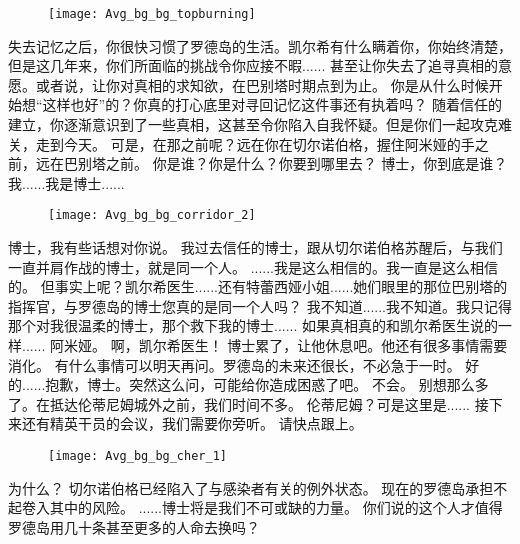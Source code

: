 \documentclass[openany]{book}
\begin{document}
\begin{figure}[h]
    \centering
    \texttt{[image: Avg\_bg\_bg\_topburning]}
\end{figure}
\begin{dialogue}
     失去记忆之后，你很快习惯了罗德岛的生活。凯尔希有什么瞒着你，你始终清楚，但是这几年来，你们所面临的挑战令你应接不暇......
     甚至让你失去了追寻真相的意愿。或者说，让你对真相的求知欲，在巴别塔时期点到为止。
     你是从什么时候开始想“这样也好”的？你真的打心底里对寻回记忆这件事还有执着吗？
     随着信任的建立，你逐渐意识到了一些真相，这甚至令你陷入自我怀疑。但是你们一起攻克难关，走到今天。
     可是，在那之前呢？远在你在切尔诺伯格，握住阿米娅的手之前，远在巴别塔之前。
     你是谁？你是什么？你要到哪里去？
     博士，你到底是谁？
     我......我是博士......
    \begin{figure}[h]
        \centering
        \texttt{[image: Avg\_bg\_bg\_corridor\_2]}
    \end{figure}
     博士，我有些话想对你说。
     我过去信任的博士，跟从切尔诺伯格苏醒后，与我们一直并肩作战的博士，就是同一个人。
     ......我是这么相信的。我一直是这么相信的。
     但事实上呢？凯尔希医生......还有特蕾西娅小姐......她们眼里的那位巴别塔的指挥官，与罗德岛的博士您真的是同一个人吗？
     我不知道......我不知道。我只记得那个对我很温柔的博士，那个救下我的博士......
     如果真相真的和凯尔希医生说的一样......
     阿米娅。
     啊，凯尔希医生！
     博士累了，让他休息吧。他还有很多事情需要消化。
     有什么事情可以明天再问。罗德岛的未来还很长，不必急于一时。
     好的......抱歉，博士。突然这么问，可能给你造成困惑了吧。
     不会。
     别想那么多了。在抵达伦蒂尼姆城外之前，我们时间不多。
     伦蒂尼姆？可是这里是......
     接下来还有精英干员的会议，我们需要你旁听。
     请快点跟上。
    \begin{figure}[h]
        \centering
        \texttt{[image: Avg\_bg\_bg\_cher\_1]}
    \end{figure}
     为什么？
     切尔诺伯格已经陷入了与感染者有关的例外状态。
     现在的罗德岛承担不起卷入其中的风险。
     ......博士将是我们不可或缺的力量。
     你们说的这个人才值得罗德岛用几十条甚至更多的人命去换吗？

\end{dialogue}
\end{document}
